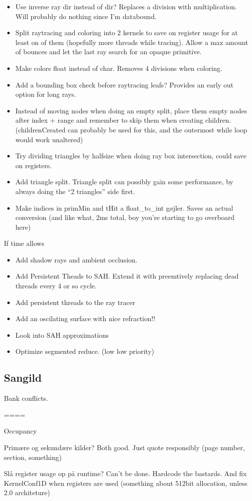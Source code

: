 \begin{itemize}
\color{red} \item Use inverse ray dir instead of dir? Replaces a
division with multiplication. Will probably do nothing since I'm
databound.
\item Split raytracing and coloring into 2 kernels to save on register
  usage for at least on of them (hopefully more threads while
  tracing). Allow a max amount of bounces and let the last ray search
  for an opaque primitive.
\item Make colors float instead of char. Removes 4 divisions when
  coloring.
\item Add a bounding box check before raytracing leafs? Provides an
  early out option for long rays.
\item Instead of moving nodes when doing an empty split, place them
  empty nodes after index + range and remember to skip them when
  creating children. (childrenCreated can probably be used for this,
  and the outermost while loop would work unaltered)
\item Try dividing triangles by halfsize when doing ray box
  intersection, could save on registers.
\item Add triangle split. Triangle split can possibly gain
  some performance, by always doing the ``2 triangles'' side first.
\item Make indices in primMin and tHit a float\_to\_int gøjler. Saves
  an actual conversion (and like what, 2ms total, boy you're starting
  to go overboard here)
\end{itemize}

If time allows

\begin{itemize}
\item Add shadow rays and ambient occlusion.
\item Add Persistent Theads to SAH. Extend it with preemtively
  replacing dead threads every 4 or so cycle.
\item Add persistent threads to the ray tracer
\item Add an oscilating surface with nice refraction!!
\item Look into SAH approximations
\item Optimize segmented reduce. (low low priority)
\end{itemize}




\subsection*{Sangild}

Bank conflicts.

====

Occupancy

Primære og sekundære kilder? Both good. Just quote responsibly (page
number, section, something)

Slå register usage op på runtime? Can't be done. Hardcode the
bastards. And fix KernelConf1D when registers are used (something
about 512bit allocation, unless 2.0 architeture)
